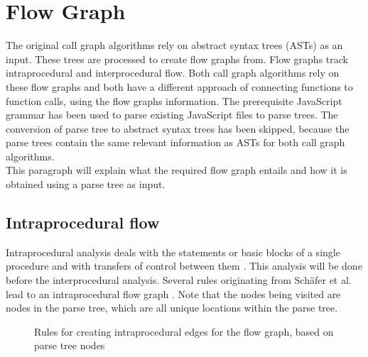 \documentclass[journal,10pt]{IEEEtran} %
\begin{document}
\section{Flow Graph}
The original call graph algorithms rely on abstract syntax trees (ASTs) as an input. These trees are processed to create flow graphs from. Flow graphs track intraprocedural and interprocedural flow. Both call graph algorithms rely on these flow graphs and both have a different approach of connecting functions to function calls, using the flow graphs information. 
The prerequisite JavaScript grammar has been used to parse existing JavaScript files to parse trees. The conversion of parse tree to abstract syntax trees has been skipped, because the parse trees contain the same relevant information as ASTs for both call graph algorithms. \\
This paragraph will explain what the required flow graph entails and how it is obtained using a parse tree as input.

\subsection{Intraprocedural flow}
Intraprocedural analysis deals with the statements or basic blocks of a single procedure and with transfers of control between them \cite[p. 3]{Marlowe:1990aa}. This analysis will be done before the interprocedural analysis. Several rules originating from Sch\"{a}fer et al. lead to an intraprocedural flow graph \cite[p. 5]{Feldthaus:2013}. Note that the nodes being visited are nodes in the parse tree, which are all unique locations within the parse tree.

\begin{figure}[H]
\hspace*{-.4cm}
\caption{Rules for creating intraprocedural edges for the flow graph, based on parse tree nodes}
\end{figure}
\end{document}
